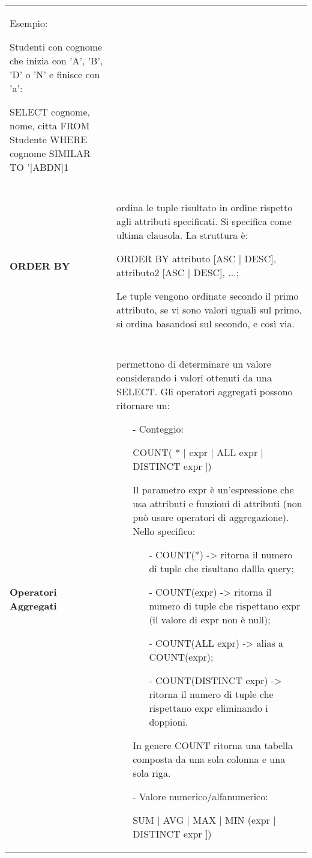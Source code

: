 \documentclass[a4paper, 10pt]{report}
\begin{document}
\begin{longtable}{ p{}  p{}}
\begin{itemize}
\begin{itemize}
	\noindent Esempio:
	
	\noindent Studenti con cognome che inizia con 'A', 'B',  'D' o 'N' e finisce con 'a':
	\begin{code}
	SELECT cognome, nome, citta FROM Studente
	WHERE cognome SIMILAR TO '[ABDN]{1}%
	\end{code}

\end{itemize}
\end{itemize}
\\\\
\textbf{ORDER BY} & ordina le tuple risultato in ordine rispetto agli attributi specificati. Si specifica come ultima clausola. La struttura è:
\begin{code}
	ORDER BY attributo [ASC | DESC], attributo2 [ASC | DESC], ...;
\end{code}
\noindent Le tuple vengono ordinate secondo il primo attributo, se vi sono valori uguali sul primo, si ordina basandosi sul secondo, e così via.
\\\\
\textbf{Operatori Aggregati} & permettono di determinare un valore considerando i valori ottenuti da una SELECT. Gli operatori aggregati possono ritornare un:
\begin{itemize}
\item[-] Conteggio:
\begin{code}
	 COUNT({ * | expr | ALL expr | DISTINCT expr }])
\end{code}
\noindent Il parametro expr è un'espressione che usa attributi e funzioni di attributi (non può usare operatori di aggregazione). Nello specifico:
	\begin{itemize}
	\item[-] COUNT(*) -> ritorna il numero di tuple che risultano dallla query;
	\item[-] COUNT(expr) -> ritorna il numero di tuple che rispettano expr (il valore di expr non è null);
	\item[-] COUNT(ALL expr) -> alias a COUNT(expr);
	\item[-] COUNT(DISTINCT expr) -> ritorna il numero di tuple che rispettano expr eliminando i doppioni.
	\end{itemize}
\noindent In genere COUNT ritorna una tabella composta da una sola colonna e una sola riga.
\item[-] Valore numerico/alfanumerico:
\begin{code}
	 SUM | AVG | MAX | MIN ({expr | DISTINCT expr }]) 
\end{code}
\end{itemize}

\end{longtable}
\end{document}
